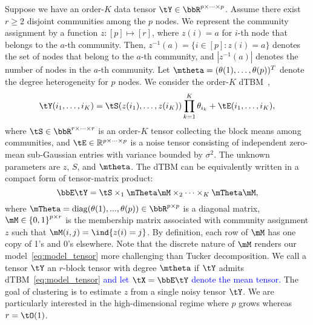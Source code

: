 \documentclass[lettersize,onecolumn,journal]{IEEEtran}
\theoremstyle{definition}
\theoremstyle{definition}
\newcommand{\offf}[1]{\left\{#1\right\}}
\begin{document}
Suppose we have an order-$K$ data tensor $\tY \in \bbR^{p \times \cdots \times p}$. %
Assume there exist $r \geq 2$  disjoint communities among the $p$ nodes. We represent the community assignment by a function $z \colon [p]\mapsto[r]$, where $z(i) = a$ for $i$-th node that belongs to the $a$-th community. Then, $z^{-1}(a)=\{i\in[p]\colon z(i)=a\}$ denotes the set of nodes that belong to the $a$-th community, and $|z^{-1}(a)|$ denotes the number of nodes in the $a$-th community. Let $\mtheta=(\theta(1),\ldots,\theta(p))^T$ denote the degree heterogeneity for $p$ nodes. We consider the order-$K$ dTBM~\citep{ghoshdastidar2017consistency,ke2019community},
\begin{equation}\label{eq:model_margin}
    \tY(i_1,\ldots,i_K) = \tS(z(i_1),\ldots,z(i_K)) \prod_{k = 1}^K\theta_{i_k} + \tE(i_1,\ldots,i_K), 
\end{equation}
\normalsize
where $\tS \in \bbR^{r \times \cdots \times r}$ is an order-$K$ tensor collecting the block means among communities, and %
$\tE\in\mathbb{R}^{p\times \cdots \times p}$ is a noise tensor consisting of independent zero-mean sub-Gaussian entries with variance bounded by $\sigma^2$. 
The unknown parameters are $z$, $S$, and $\mtheta$. The dTBM can be equivalently written in a compact form of tensor-matrix product:
\begin{equation}\label{eq:model_tensor}
\bbE\tY = \tS \times_1 \mTheta \mM \times_2 \cdots \times_K  \mTheta \mM,
\end{equation}
where $\mTheta = \text{diag}(\theta(1),...,\theta(p)) \in \bbR^{p \times p}$ is a diagonal matrix, $\mM \in \offf{0,1}^{p \times r}$ is the membership matrix associated with community assignment $z$ such that $\mM(i,j)=\ind\{z(i)=j\}$. By definition, each row of $\mM$ has one copy of 1's and 0's elsewhere. Note that the discrete nature of $\mM$ renders our model~\eqref{eq:model_tensor} more challenging than Tucker decomposition. We call a tensor $\tY$ an $r$-block tensor with degree $\mtheta$ if $\tY$ admits dTBM~\eqref{eq:model_tensor} \textcolor{blue}{and let $\tX = \bbE \tY$ denote the mean tensor.} The goal of clustering is to estimate $z$ from a single noisy tensor $\tY$. We are particularly interested in the high-dimensional regime where $p$ grows whereas $r=\tO(1)$. 
\end{document}
